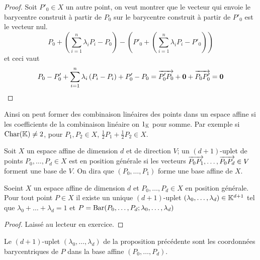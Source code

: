 \begin{proof}
	Soit $P'_0 \in X$ un autre point, on veut montrer que le vecteur qui envoie
	le barycentre construit à partir de $P_0$ sur le barycentre construit à
	partir de $P'_0$ est le vecteur nul.
	\begin{equation*}
		P_0 + \left(\sum_{i=1}^n \lambda_i P_i - P_0\right) -
		\left(P'_0 + \left(\sum_{i=1}^n \lambda_i P_i - P'_0\right)\right)
	\end{equation*}
	et ceci vaut
	\begin{equation*}
		P_0 - P'_0 + \sum_{i=1}^n \lambda_i \left(P_i - P_i\right) + P'_0 - P_0
		= \overrightarrow{P'_0 P_0} + \mathbf{0} + \overrightarrow{P_0 P'_0} = \mathbf{0}
	\end{equation*}
\end{proof}

\begin{remark}
	Ainsi on peut former des combinaison linéaires des points dans un espace
	affine si les coefficients de la combinaison linéaire on $1_{\mathbb{K}}$ pour somme.
	Par exemple si $\operatorname{Char}(\mathbb{K}) \neq 2$, pour $P_1, P_2 \in X$,
	$\frac{1}{2}P_1 + \frac{1}{2}P_2 \in X$.
\end{remark}

\begin{definition}
	Soit $X$ un espace affine de dimension $d$ et de direction $V$; un
	$(d+1)$-uplet de points $P_0, \dots, P_d \in X$ est en position générale si
	les vecteurs $\overrightarrow{P_0 P_1}, \dots, \overrightarrow{P_0 P_d} \in V$ forment une base
	de $V$. On dira que $(P_0, \dots, P_1)$ forme une base affine de $X$.
\end{definition}

\begin{proposition}
	Soeint $X$ un espace affine de dimension $d$ et $P_0, \dots, P_d \in X$ en
	position générale. Pour tout point $P \in X$ il existe un unique
	$(d+1)$-uplet $(\lambda_0, \dots, \lambda_d) \in \mathbb{K}^{d+1}$ tel que
	$\lambda_0 + \dots + \lambda_d = 1$ et
	$P = \operatorname{Bar}(P_0, \dots, P_d; \lambda_0, \dots, \lambda_d)$
\end{proposition}

\begin{proof}
	Laissé au lecteur en exercice.
\end{proof}

\begin{definition}
	Le $(d+1)$-uplet $(\lambda_0, \dots, \lambda_d)$ de la proposition précédente
	sont les coordonnées
	barycentriques de $P$ dans la base affine $(P_0, \dots, P_d)$.
\end{definition}

